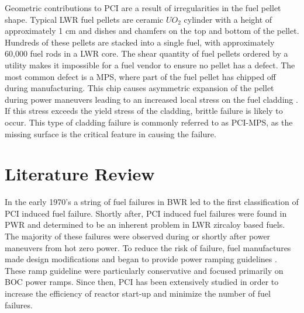 \documentclass[edeposit,fullpage,11pt]{uiucthesis2009}
\begin{document}
Geometric contributions to \gls{PCI} are a result of irregularities in the fuel pellet shape.
Typical \gls{LWR} fuel pellets are ceramic $UO_2$ cylinder with a height of approximately 1 cm and dishes and chamfers on the top and bottom of the pellet.
Hundreds of these pellets are stacked into a single fuel, with approximately 60,000 fuel rods in a \gls{LWR} core.
The shear quantity of fuel pellets ordered by a utility makes it impossible for a fuel vendor to ensure no pellet has a defect.
The most common defect is a \gls{MPS}, where part of the fuel pellet has chipped off during manufacturing.
This chip causes asymmetric expansion of the pellet during power maneuvers leading to an increased local stress on the fuel cladding \cite{capps_evaluation_2016}. 
If this stress exceeds the yield stress of the cladding, brittle failure is likely to occur.
This type of cladding failure is commonly referred to as \gls{PCI}-\gls{MPS}, as the missing surface is the critical feature in causing the failure.


\section{Literature Review}

In the early 1970's a string of fuel failures in \gls{BWR} led to the first classification of \gls{PCI} induced fuel failure.  
Shortly after, \gls{PCI} induced fuel failures were found in \gls{PWR} and determined to be an inherent problem in \gls{LWR} zircaloy based fuels. %
The majority of these failures were observed during or shortly after power maneuvers from hot zero power.
To reduce the risk of failure, fuel manufactures made design modifications and began to provide power ramping guidelines \cite{kennard_pci_2016}.
These ramp guideline were particularly conservative and focused primarily on \gls{BOC} power ramps. 
Since then, \gls{PCI} has been extensively studied in order to increase the efficiency of reactor start-up and minimize the number of fuel failures.
 
\end{document}
